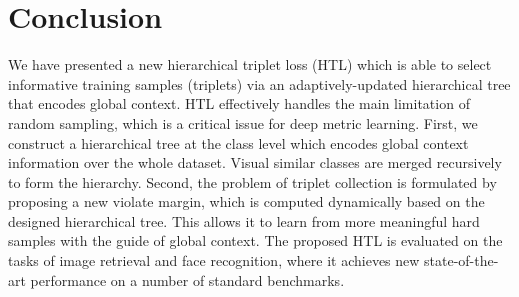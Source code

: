 \documentclass[runningheads]{llncs}
\begin{document}
%
 	\section{Conclusion}\vspace{-3mm}
We have presented a new hierarchical triplet loss (HTL) which is able to
select informative training samples (triplets) via an adaptively-updated hierarchical tree that encodes global context. HTL effectively handles the main limitation of random sampling, which is a critical issue for deep metric learning. First, we construct a hierarchical
tree at the class level which encodes global context information over the whole dataset. Visual similar classes are merged recursively to form the hierarchy. Second, the problem of triplet collection is formulated by proposing a new violate margin, which is computed dynamically
based on the designed hierarchical tree. This allows it to learn from more meaningful hard samples with the guide of global context.
The proposed HTL is evaluated on the tasks of image retrieval and face recognition, where it achieves new state-of-the-art performance on a number of standard benchmarks.
 	
\clearpage


	
\end{document}
